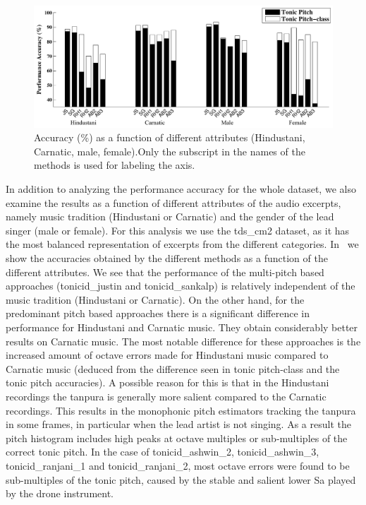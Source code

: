 {\begin{figure}
	\begin{center}
		\includegraphics[width=\figSizeHundred]{ch05_preprocessing/figures/Category_Performance.pdf}
	\end{center}
	\caption[Tonic identification accuracy of different approaches for Hindustani, Carnatic, male and female excerpts.]{Accuracy (\%) as a function of different attributes (Hindustani, Carnatic, male, female).Only the subscript in the names of the methods is used for labeling the axis.}
	\label{fig:tonic_id_categorywise_performance}
\end{figure}

In addition to analyzing the performance accuracy for the whole dataset, we also examine the results as a function of different attributes of
the audio excerpts, namely music tradition (Hindustani or Carnatic) and the gender of the lead singer (male or female). For this analysis we use the \acrshort{tds_cm2} dataset, as it has the most balanced representation of excerpts from the different categories. In~ we show the accuracies obtained by the different methods as a function of the different attributes. We see that the performance of the multi-pitch based approaches (\acrshort{tonicid_justin} and \acrshort{tonicid_sankalp}) is relatively independent of the music tradition (Hindustani or Carnatic). On the other hand, for the predominant pitch based approaches there is a significant difference in performance for Hindustani and Carnatic music. They obtain considerably better results on Carnatic music. The most notable difference for these approaches is the increased amount of octave errors made for Hindustani music compared to Carnatic music (deduced from the difference seen in tonic pitch-class and the tonic pitch accuracies). A possible reason for this is that in the Hindustani recordings the \gls{tanpura} is generally more salient compared to the Carnatic recordings. This results in the monophonic pitch estimators tracking the \gls{tanpura} in some frames, in particular when the lead artist is not singing. As a result the pitch histogram includes high peaks at octave multiples or sub-multiples of the correct tonic pitch. In the case of \acrshort{tonicid_ashwin_2}, \acrshort{tonicid_ashwin_3}, \acrshort{tonicid_ranjani_1} and \acrshort{tonicid_ranjani_2}, most octave errors were found to be sub-multiples of the tonic pitch, caused by the stable and salient lower Sa played by the drone instrument.

}
